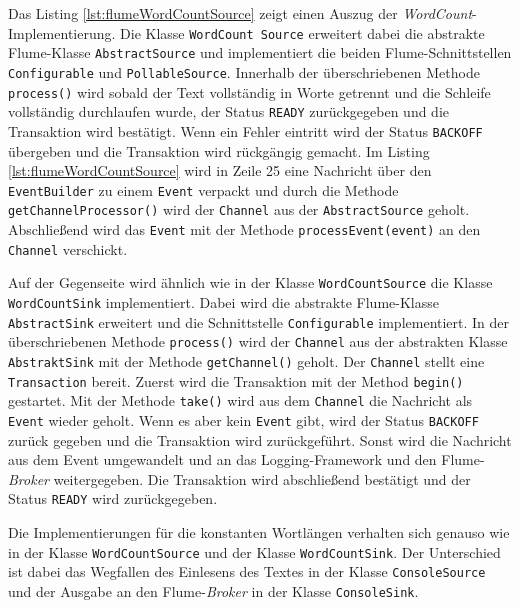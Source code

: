 Das Listing \ref{lst:flumeWordCountSource} zeigt einen Auszug der \textit{WordCount}-Implementierung. Die Klasse \texttt{WordCount Source} erweitert dabei die abstrakte Flume-Klasse \texttt{AbstractSource} und implementiert die beiden Flume-Schnittstellen \texttt{Configurable} und \texttt{PollableSource}. Innerhalb der überschriebenen Methode \texttt{process()} wird sobald der Text vollständig in Worte getrennt und die Schleife vollständig durchlaufen wurde, der Status \texttt{READY} zurückgegeben und die Transaktion wird bestätigt. Wenn ein Fehler eintritt wird der Status \texttt{BACKOFF} übergeben und die Transaktion wird rückgängig gemacht. Im Listing \ref{lst:flumeWordCountSource} wird in Zeile 25 eine Nachricht über den \texttt{EventBuilder} zu einem \texttt{Event} verpackt und durch die Methode \texttt{getChannelProcessor()} wird der \texttt{Channel} aus der \texttt{AbstractSource} geholt. Abschließend wird das \texttt{Event} mit der Methode \texttt{processEvent(event)} an den \texttt{Channel} verschickt.



Auf der Gegenseite wird ähnlich wie in der Klasse \texttt{WordCountSource} die Klasse \texttt{WordCountSink} implementiert. Dabei wird die abstrakte Flume-Klasse \texttt{AbstractSink} erweitert und die Schnittstelle \texttt{Configurable} implementiert. In der überschriebenen Methode \texttt{process()} wird der \texttt{Channel} aus der abstrakten Klasse \texttt{AbstraktSink} mit der Methode \texttt{getChannel()} geholt. Der \texttt{Channel} stellt eine \texttt{Transaction} bereit. Zuerst wird die Transaktion mit der Method \texttt{begin()} gestartet. Mit der Methode \texttt{take()} wird aus dem \texttt{Channel} die Nachricht als \texttt{Event} wieder geholt. Wenn es aber kein \texttt{Event} gibt, wird der Status \texttt{BACKOFF} zurück gegeben und die Transaktion wird zurückgeführt. Sonst wird die Nachricht aus dem Event umgewandelt und an das Logging-Framework und den Flume-\textit{Broker} weitergegeben. Die Transaktion wird abschließend bestätigt und der Status \texttt{READY} wird zurückgegeben.

Die Implementierungen für die konstanten Wortlängen verhalten sich genauso wie in der Klasse \texttt{WordCountSource} und der Klasse \texttt{WordCountSink}. Der Unterschied ist dabei das Wegfallen des Einlesens des Textes in der Klasse \texttt{ConsoleSource} und der Ausgabe an den Flume-\textit{Broker} in der Klasse \texttt{ConsoleSink}.

